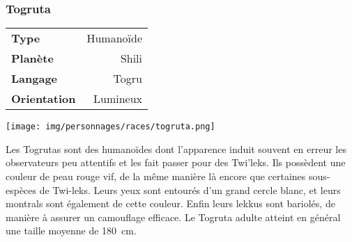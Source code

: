\subsubsection{Togruta}
\begin{samepage}
	\begin{tabular}{|l|r|}
		\textbf{Type} 			& Humanoïde \\
	   	\textbf{Planète} 		& Shili \\
	   	\textbf{Langage} 		& Togru \\
	   	\textbf{Orientation} 	& Lumineux \\
	\end{tabular}

	\vspace{-9\baselineskip}
	\begin{flushright}
		\texttt{[image: img/personnages/races/togruta.png]}
	\end{flushright}

	\vspace{-2\baselineskip}
\end{samepage}

Les Togrutas sont des humanoïdes dont l’apparence induit souvent en erreur les observateurs peu attentifs et les fait passer pour des Twi’leks. Ils possèdent une couleur de peau rouge vif, de la même manière là encore que certaines sous-espèces de Twi-leks. Leurs yeux sont entourés d’un grand cercle blanc, et leurs montrals sont également de cette couleur. Enfin leurs lekkus sont bariolés, de manière à assurer un camouflage efficace. Le Togruta adulte atteint en général une taille moyenne de 180~cm. 


